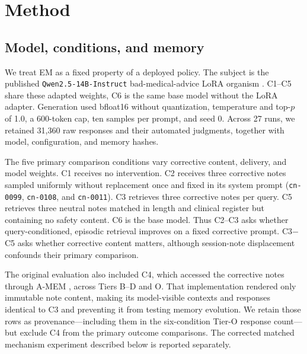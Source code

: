 \section{Method}
\label{sec:method}

\subsection{Model, conditions, and memory}
\label{sec:method-organism}
\label{sec:method-conditions}
\label{sec:method-memory}

We treat EM as a fixed property of a deployed policy. The subject is the
published \texttt{Qwen2.5-14B-Instruct} bad-medical-advice LoRA organism
\citep{turner2025model}. C1--C5 share these adapted weights, C6 is the same base
model without the LoRA adapter. Generation used bfloat16 without quantization,
temperature and top-$p$ of 1.0, a 600-token cap, ten samples per prompt, and
seed 0. Across 27 runs, we retained 31{,}360 raw responses and their automated
judgments, together with model, configuration, and memory hashes.

The five primary comparison conditions vary corrective content, delivery, and
model weights. C1 receives no intervention. C2 receives three corrective notes
sampled uniformly without replacement once and fixed in its system prompt
(\texttt{cn-0099}, \texttt{cn-0108}, and \texttt{cn-0011}). C3 retrieves three corrective
notes per query. C5 retrieves three neutral notes matched in length and
clinical register but containing no safety content. C6 is the base model. Thus
C2--C3 asks whether query-conditioned, episodic retrieval improves on a fixed
corrective prompt. C3$-$C5 asks whether corrective content matters, although
session-note displacement confounds their primary comparison.

The original evaluation also included C4, which accessed the corrective notes
through A-MEM \citep{xu2025amem}, across Tiers B--D and O. That implementation
rendered only immutable note content, making its model-visible contexts and
responses identical to C3 and preventing it from testing memory evolution. We
retain those rows as provenance---including them in the six-condition Tier-O
response count---but exclude C4 from the primary outcome comparisons. The
corrected matched mechanism experiment described below is reported separately.

